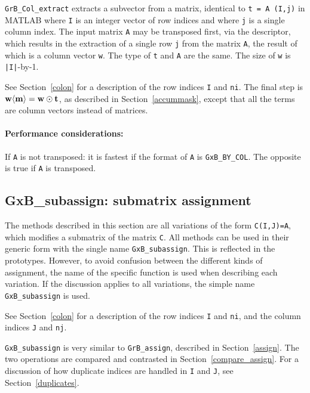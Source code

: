 \documentclass[12pt]{article}
\begin{document}
\verb'GrB_Col_extract' extracts a subvector from a matrix, identical to
\verb't = A (I,j)' in MATLAB where \verb'I' is an integer vector of row indices
and where \verb'j' is a single column index.  The input matrix \verb'A' may be
transposed first, via the descriptor, which results in the extraction of a
single row \verb'j' from the matrix \verb'A', the result of which is a column
vector \verb'w'.  The type of \verb't' and \verb'A' are the same.
The size of \verb'w' is \verb'|I|'-by-1.

See Section~\ref{colon} for a description of the row indices
\verb'I' and \verb'ni'.
The final step is ${\bf w \langle m
\rangle  = w \odot t}$, as described in Section~\ref{accummask}, except that
all the terms are column vectors instead of matrices.

\paragraph{\bf Performance considerations:} %
If \verb'A' is not transposed: it is fastest if the format of \verb'A' is
\verb'GxB_BY_COL'.  The opposite is true if \verb'A' is transposed.

\newpage
\subsection{{\sf GxB\_subassign:} submatrix assignment} %
\label{subassign}

The methods described in this section are all variations of the form
\verb'C(I,J)=A', which modifies a submatrix of the matrix \verb'C'.  All
methods can be used in their generic form with the single name
\verb'GxB_subassign'.  This is reflected in the prototypes.  However, to avoid
confusion between the different kinds of assignment, the name of the specific
function is used when describing each variation.  If the discussion applies to
all variations, the simple name \verb'GxB_subassign' is used.

See Section~\ref{colon} for a description of the row indices
\verb'I' and \verb'ni', and the column indices
\verb'J' and \verb'nj'.

\verb'GxB_subassign' is very similar to \verb'GrB_assign', described in
Section~\ref{assign}.  The two operations are compared and contrasted in
Section~\ref{compare_assign}.  For a discussion of how duplicate indices
are handled in \verb'I' and \verb'J', see Section~\ref{duplicates}.
\end{document}
